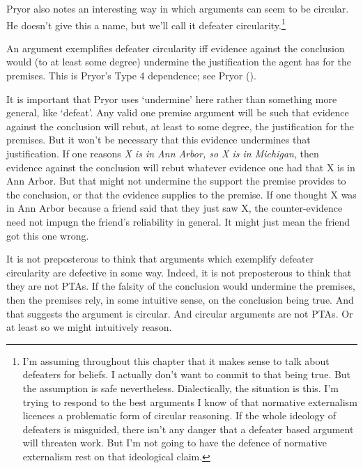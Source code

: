 \documentclass[
  10pt,
  letterpaper,
  twoside]{scrbook}
\providecommand{\tightlist}{%
  \setlength{\itemsep}{0pt}\setlength{\parskip}{0pt}}\usepackage{longtable,booktabs,array}
\begin{document}
Pryor also notes an interesting way in which arguments can seem to be
circular. He doesn't give this a name, but we'll call it defeater
circularity.\footnote{I'm assuming throughout this chapter that it makes
  sense to talk about defeaters for beliefs. I actually don't want to
  commit to that being true. But the assumption is safe nevertheless.
  Dialectically, the situation is this. I'm trying to respond to the
  best arguments I know of that normative externalism licences a
  problematic form of circular reasoning. If the whole ideology of
  defeaters is misguided, there isn't any danger that a defeater based
  argument will threaten work. But I'm not going to have the defence of
  normative externalism rest on that ideological claim.}

\begin{description}
\tightlist
\item[Defeater Circularity]
An argument exemplifies defeater circularity iff evidence against the
conclusion would (to at least some degree) undermine the justification
the agent has for the premises. This is Pryor's Type 4 dependence; see
Pryor ().
\end{description}

It is important that Pryor uses `undermine' here rather than something
more general, like `defeat'. Any valid one premise argument will be such
that evidence against the conclusion will rebut, at least to some
degree, the justification for the premises. But it won't be necessary
that this evidence undermines that justification. If one reasons \emph{X
is in Ann Arbor, so X is in Michigan}, then evidence against the
conclusion will rebut whatever evidence one had that X is in Ann Arbor.
But that might not undermine the support the premise provides to the
conclusion, or that the evidence supplies to the premise. If one thought
X was in Ann Arbor because a friend said that they just saw X, the
counter-evidence need not impugn the friend's reliability in general. It
might just mean the friend got this one wrong.

It is not preposterous to think that arguments which exemplify defeater
circularity are defective in some way. Indeed, it is not preposterous to
think that they are not PTAs. If the falsity of the conclusion would
undermine the premises, then the premises rely, in some intuitive sense,
on the conclusion being true. And that suggests the argument is
circular. And circular arguments are not PTAs. Or at least so we might
intuitively reason.
\end{document}
